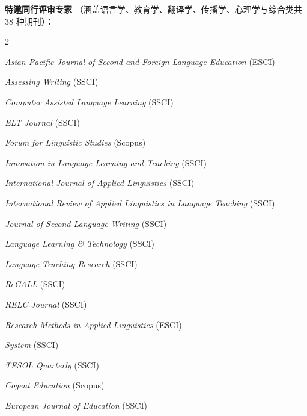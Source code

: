 \documentclass[11pt,a4paper]{article}
\newcommand{\listitemspace}{0.14em}
\renewenvironment{itemize}
{
  \begin{list}{}{\setlength{\leftmargin}{0em}
      \setlength{\parskip}{0em}
      \setlength{\itemsep}{\listitemspace}
      \setlength{\parsep}{\listitemspace}}}
  {
\end{list}}
\begin{document}
\vspace{0.25em}
\noindent\textbf{特邀同行评审专家} {\small\color{black!65}（涵盖语言学、教育学、翻译学、传播学、心理学与综合类共 38 种期刊）：}
\setlength{\multicolsep}{3pt}
\setlength{\columnsep}{1.6em}
\begin{multicols}{2}
\small
\begin{itemize}
  \setlength{\itemsep}{0.05em}
  \setlength{\parsep}{0em}
  \item \textit{Asian-Pacific Journal of Second and Foreign Language Education} {\footnotesize\color{black!65}(ESCI)}
  \item \textit{Assessing Writing} {\footnotesize\color{black!65}(SSCI)}
  \item \textit{Computer Assisted Language Learning} {\footnotesize\color{black!65}(SSCI)}
  \item \textit{ELT Journal} {\footnotesize\color{black!65}(SSCI)}
  \item \textit{Forum for Linguistic Studies} {\footnotesize\color{black!65}(Scopus)}
  \item \textit{Innovation in Language Learning and Teaching} {\footnotesize\color{black!65}(SSCI)}
  \item \textit{International Journal of Applied Linguistics} {\footnotesize\color{black!65}(SSCI)}
  \item \textit{International Review of Applied Linguistics in Language Teaching} {\footnotesize\color{black!65}(SSCI)}
  \item \textit{Journal of Second Language Writing} {\footnotesize\color{black!65}(SSCI)}
  \item \textit{Language Learning \& Technology} {\footnotesize\color{black!65}(SSCI)}
  \item \textit{Language Teaching Research} {\footnotesize\color{black!65}(SSCI)}
  \item \textit{ReCALL} {\footnotesize\color{black!65}(SSCI)}
  \item \textit{RELC Journal} {\footnotesize\color{black!65}(SSCI)}
  \item \textit{Research Methods in Applied Linguistics} {\footnotesize\color{black!65}(ESCI)}
  \item \textit{System} {\footnotesize\color{black!65}(SSCI)}
  \item \textit{TESOL Quarterly} {\footnotesize\color{black!65}(SSCI)}
  \item \textit{Cogent Education} {\footnotesize\color{black!65}(Scopus)}
  \item \textit{European Journal of Education} {\footnotesize\color{black!65}(SSCI)}

\end{itemize}
\end{multicols}
\end{document}
